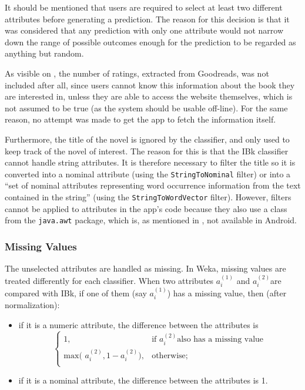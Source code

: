 \documentclass{mproj}
\begin{document}
It should be mentioned that users are required to select at least two different attributes before generating a prediction. The reason for this decision is that it was considered that any prediction with only one attribute would not narrow down the range of possible outcomes enough for the prediction to be regarded as anything but random. \par

As visible on , the number of ratings, extracted from Goodreads, was not included after all, since users cannot know this information about the book they are interested in, unless they are able to access the website themselves, which is not assumed to be true (as the system should be usable off-line). For the same reason, no attempt was made to get the app to fetch the information itself. \par

Furthermore, the title of the novel is ignored by the classifier, and only used to keep track of the novel of interest. The reason for this is that the IBk classifier cannot handle string attributes. It is therefore necessary to filter the title so it is converted into a nominal attribute (using the \verb|StringToNominal| filter) or into a ``set of nominal attributes representing word occurrence information from the text contained in the string'' (using the \verb|StringToWordVector| filter). However, filters cannot be applied to attributes in the app's code because they also use a class from the \verb|java.awt| package, which is, as mentioned in , not available in Android.

\subsubsection*{Missing Values}\label{missing_values}
The unselected attributes are handled as missing. In Weka, missing values are treated differently for each classifier. When two attributes $a_i^{(1)}$ and $a_i^{(2)}$are compared with IBk, if one of them (say $a_i^{(1)}$) has a missing value, then (after normalization):
\begin{itemize}[topsep=0pt]
	\item if it is a numeric attribute, the difference between the attributes is
	\begin{equation}
		\begin{cases}
			1, & \text{if } a_i^{(2)} \text{also has a missing value} \\
			\text{max( }a_i^{(2)} , 1 - a_i^{(2)} \text{)}, & \text{otherwise;} \\
		\end{cases}
	\end{equation}
	\item if it is a nominal attribute, the difference between the attributes is 1.	
\end{itemize}
\end{document}
